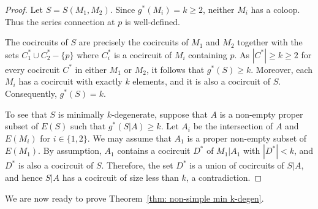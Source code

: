 \documentclass{amsart}
\theoremstyle{definition}
\theoremstyle{remark}
\numberwithin{equation}{section}
\begin{document}
\begin{proof}
    Let $S=S(M_1,M_2)$. Since $g^*(M_i)=k\geq 2$, neither $M_i$ has a coloop. Thus the series connection at $p$ is well-defined.

    The cocircuits of $S$ are precisely the cocircuits of $M_1$ and $M_2$ together with the sets $C_1^*\cup C_2^*-\{p\}$ where $C_i^*$ is a cocircuit of $M_i$ containing $p$. As $|C^*|\geq k\geq 2$ for every cocircuit $C^*$ in either $M_1$ or $M_2$, it follows that $g^*(S)\geq k$. Moreover, each $M_i$ has a cocircuit with exactly $k$ elements, and it is also a cocircuit of $S$. Consequently, $g^*(S)=k$.

    To see that $S$ is minimally $k$-degenerate, suppose that $A$ is a non-empty proper subset of $E(S)$ such that $g^*(S|A)\geq k$. Let $A_i$ be the intersection of $A$ and $E(M_i)$ for $i\in\{1,2\}$. We may assume that $A_1$ is a proper non-empty subset of $E(M_1)$. By assumption, $A_1$ contains a cocircuit $D^*$ of $M_1|A_1$ with $|D^*|<k$, and $D^*$ is also a cocircuit of $S$. Therefore, the set $D^*$ is a union of cocircuits of $S|A$, and hence $S|A$ has a cocircuit of size less than $k$, a contradiction.
\end{proof}

We are now ready to prove Theorem~\ref{thm: non-simple min k-degen}. 
\end{document}
